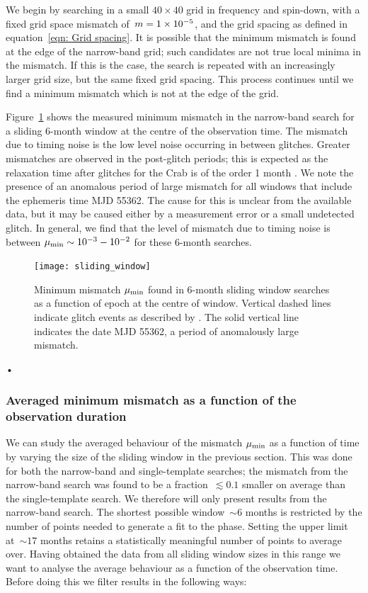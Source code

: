 \documentclass[../full_thesis/full_thesis.tex]{subfiles}
\begin{document}
We begin by searching in a small
$40\times40$ grid in frequency and spin-down, with a fixed grid space
mismatch of~$m=1\times10^{-5}$, and the grid spacing as defined in
equation~\eqref{eqn: Grid spacing}. It is possible that the minimum mismatch is
found at the edge of the narrow-band grid; such candidates  are not true local
minima in the mismatch. If this is the case, the search is repeated with an
increasingly larger grid size, but the same fixed grid spacing.  This process
continues until we find a minimum mismatch which is not at the edge of the
grid. 

Figure~\ref{fig: sliding window} shows the measured minimum mismatch in the
narrow-band search for a sliding 6-month window at the centre of the
observation time. The mismatch due to timing noise is the low level noise
occurring in between glitches. Greater mismatches are observed in the
post-glitch periods; this is expected as the relaxation time after glitches for
the Crab is of the order 1 month \citep{Lyne2012book}.  We note the presence of
an anomalous period of large mismatch for all  windows that include the
ephemeris time MJD 55362. The cause for this is unclear from the available
data, but it may be caused either by a measurement error or a small undetected
glitch. In general, we find that the level of mismatch due to timing noise is
between $\mu_{\mathrm{min}} \sim 10^{-3} - 10^{-2}$ for these 6-month searches.

\begin{figure}[htb]
\centering
\texttt{[image: sliding\_window]}
\caption{Minimum mismatch $\mu_{\mathrm{min}}$ found in 6-month sliding window searches
    as a function of epoch
     at the centre of  window.  Vertical dashed lines
    indicate glitch events as described by \citet{Espinoza2011}. The solid  
    vertical line indicates the date MJD 55362, a period of anomalously 
    large mismatch.}
\label{fig: sliding window}
\end{figure}•



\subsubsection{Averaged minimum mismatch as a function of the observation duration}
\label{sec: averaged mismatch as a function of the observation duration}

We can study the averaged behaviour of the mismatch $\mu_{\mathrm{min}}$ as a function of
time by varying the size of the sliding window in the previous section. This
was done for both the narrow-band and single-template searches; the mismatch
from the narrow-band search was found to be  a fraction~$\lesssim 0.1$ smaller
on average than the single-template search. We therefore will only present
results from the narrow-band search. The shortest possible window~$\sim 6$
months is restricted by the number of points needed to generate a fit to the
phase.  Setting the upper limit at~$\sim 17$ months retains a statistically
meaningful number of points to average over. Having obtained the data from all
sliding window sizes in this range we want to analyse the average behaviour as
a function of the observation time. Before doing this we filter results in the
following ways:
\end{document}
